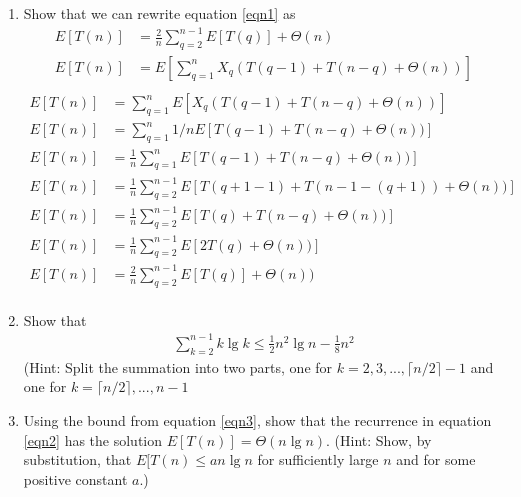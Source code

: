 \documentclass{article}
\begin{document}
\begin{enumerate}
\begin{enumerate}
      \item
        Show that we can rewrite equation \ref{eqn1} as
        \begin{align}
          E[T(n)] &= \frac{2}{n}\sum_{q=2}^{n-1}E[T(q)] + \Theta(n)
            \label{eqn2} \\
            E[T(n)] &= E\left[
          \sum_{q=1}^n X_q(T(q-1) + T(n-q) + \Theta(n))
          \right]
        \end{align}
        \begin{align}
        \label{eqn1} \\
        E[T(n)] &= 
          \sum_{q=1}^n E\left[ X_q(T(q-1) + T(n-q) + \Theta(n))
          \right] \\
        E[T(n)] &= 
          \sum_{q=1}^n 1/nE\left[ T(q-1) + T(n-q) + \Theta(n))
          \right]\\
        E[T(n)] &= 
        \frac{1}{n}\sum_{q=1}^n E\left[ T(q-1) + T(n-q) + \Theta(n))
        \right]\\
        E[T(n)] &= 
        \frac{1}{n}\sum_{q=2}^{n - 1} E\left[ T(q + 1 -1) + T(n - 1 -(q + 1)) + \Theta(n)) 
        \right]\\
        E[T(n)] &= 
        \frac{1}{n}\sum_{q=2}^{n - 1} E\left[ T(q) + T(n-q) + \Theta(n)) 
        \right]\\
        E[T(n)] &= 
        \frac{1}{n}\sum_{q=2}^{n - 1} E\left[ 2T(q) + \Theta(n)) 
        \right]\\
        E[T(n)] &= 
        \frac{2}{n}\sum_{q=2}^{n - 1} E\left[ T(q)\right] + \Theta(n)) 
        \\
        \end{align}
  
      \item
        Show that
        \begin{align}
          \sum_{k=2}^{n-1} k \lg k \leq \frac{1}{2}n^2\lg n -
          \frac{1}{8} n^2
          \label{eqn3}
        \end{align}
        (Hint: Split the summation into two parts, one for
        $k=2,3,...,\lceil n/2 \rceil - 1$
        and one for
        $k= \lceil n/2\rceil,...,n-1$
  
      \item
        Using the bound from equation \ref{eqn3}, show that the
        recurrence in equation \ref{eqn2} has the solution
        $E[T(n)] = \Theta(n\lg n)$.  (Hint: Show, by substitution, that
        $E[T(n)\leq an\lg n$ for sufficiently large $n$ and for some
          positive constant $a$.) 
  
    \end{enumerate}
  \end{enumerate}
  
  
\end{document}
